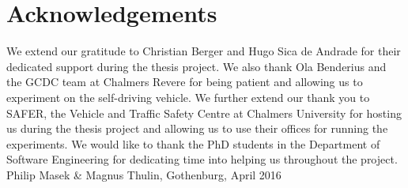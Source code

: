 \thispagestyle{plain}			%
\section*{Acknowledgements}
We extend our gratitude to Christian Berger and Hugo Sica de Andrade for their dedicated support during the thesis project. We also thank Ola Benderius and the GCDC team at Chalmers Revere for being patient and allowing us to experiment on the self-driving vehicle. We further extend our thank you to SAFER, the Vehicle and Traffic Safety Centre at Chalmers University for hosting us during the thesis project and allowing us to use their offices for running the experiments. We would like to thank the PhD students in the Department of Software Engineering for dedicating time into helping us throughout the project.\newline \newline \newline
\vspace{1.5cm}
\hfill
Philip Masek \& Magnus Thulin, Gothenburg, April 2016 \\

\newpage				%
\thispagestyle{empty}
\mbox{}